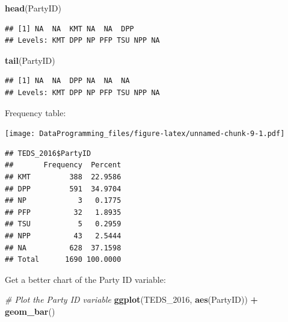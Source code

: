 \documentclass[]{book}
\newenvironment{Shaded}{\begin{snugshade}}{\end{snugshade}}
\newcommand{\CommentTok}[1]{\textcolor[rgb]{0.56,0.35,0.01}{\textit{#1}}}
\newcommand{\DecValTok}[1]{\textcolor[rgb]{0.00,0.00,0.81}{#1}}
\newcommand{\KeywordTok}[1]{\textcolor[rgb]{0.13,0.29,0.53}{\textbf{#1}}}
\newcommand{\NormalTok}[1]{#1}
\newcommand{\OperatorTok}[1]{\textcolor[rgb]{0.81,0.36,0.00}{\textbf{#1}}}
\newcommand{\StringTok}[1]{\textcolor[rgb]{0.31,0.60,0.02}{#1}}
\begin{document}
\begin{Shaded}
\begin{Highlighting}[]
\KeywordTok{head}\NormalTok{(PartyID)}
\end{Highlighting}
\end{Shaded}

\begin{verbatim}
## [1] NA  NA  KMT NA  NA  DPP
## Levels: KMT DPP NP PFP TSU NPP NA
\end{verbatim}

\begin{Shaded}
\begin{Highlighting}[]
\KeywordTok{tail}\NormalTok{(PartyID)}
\end{Highlighting}
\end{Shaded}

\begin{verbatim}
## [1] NA  NA  DPP NA  NA  NA 
## Levels: KMT DPP NP PFP TSU NPP NA
\end{verbatim}

Frequency table:

\begin{Shaded}
\end{Shaded}

\texttt{[image: DataProgramming\_files/figure-latex/unnamed-chunk-9-1.pdf]}

\begin{verbatim}
## TEDS_2016$PartyID 
##       Frequency  Percent
## KMT         388  22.9586
## DPP         591  34.9704
## NP            3   0.1775
## PFP          32   1.8935
## TSU           5   0.2959
## NPP          43   2.5444
## NA          628  37.1598
## Total      1690 100.0000
\end{verbatim}

Get a better chart of the Party ID variable:

\begin{Shaded}
\begin{Highlighting}[]
\CommentTok{# Plot the Party ID variable}
\KeywordTok{ggplot}\NormalTok{(TEDS_}\DecValTok{2016}\NormalTok{, }\KeywordTok{aes}\NormalTok{(PartyID)) }\OperatorTok{+}\StringTok{ }
\StringTok{  }\KeywordTok{geom_bar}\NormalTok{()}
\end{Highlighting}
\end{Shaded}
\end{document}
